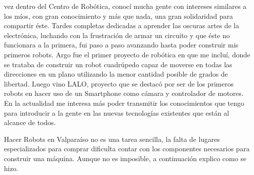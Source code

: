 vez dentro del Centro de Robótica, conocí mucha gente con intereses similares a los míos, con gran conocimiento y más que nada, una gran solidaridad para compartir éste. Tardes completas dedicadas a aprender las oscuras artes de la electrónica, luchando con la frustración de armar un circuito y que éste no funcionara a la primera, fui paso a paso avanzando hasta poder construir mis primeros robots. Argo fue el primer proyecto de robótica en que me incluí, donde se trataba de construir un robot cuadrúpedo capaz de moverse en todas las direcciones en un plano utilizando la menor cantidad posible de grados de libertad. Luego vino LALO, proyecto que se destacó por ser de los primeros robots en hacer uso de un Smartphone como cámara y controlador de motores. En la actualidad me interesa más poder transmitir los conocimientos que tengo para introducir a la gente en las nuevas tecnologías existentes que están al alcance de todos.

Hacer Robots en Valparaíso no es una tarea sencilla, la falta de lugares especializados para comprar dificulta contar con los componentes necesarios para construir una máquina. Aunque no es imposible, a continuación explico como se hizo.



